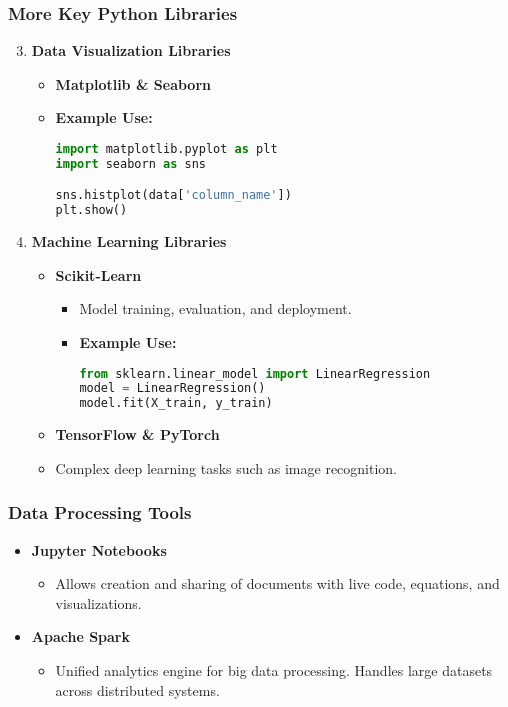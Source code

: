 \documentclass[aspectratio=169]{beamer}
\begin{document}
\begin{frame}[fragile]
    \frametitle{More Key Python Libraries}
    \begin{enumerate}
        \setcounter{enumi}{2}
        \item \textbf{Data Visualization Libraries}
        \begin{itemize}
            \item \textbf{Matplotlib \& Seaborn}
            \item \textbf{Example Use:}
            \begin{lstlisting}[language=Python]
import matplotlib.pyplot as plt
import seaborn as sns

sns.histplot(data['column_name'])
plt.show()
            \end{lstlisting}
        \end{itemize}

        \item \textbf{Machine Learning Libraries}
        \begin{itemize}
            \item \textbf{Scikit-Learn}
            \begin{itemize}
                \item Model training, evaluation, and deployment.
                \item \textbf{Example Use:}
                \begin{lstlisting}[language=Python]
from sklearn.linear_model import LinearRegression
model = LinearRegression()
model.fit(X_train, y_train)
                \end{lstlisting}
            \end{itemize}
            \item \textbf{TensorFlow \& PyTorch}
            \item Complex deep learning tasks such as image recognition.
        \end{itemize}
    \end{enumerate}
\end{frame}

\begin{frame}
    \frametitle{Data Processing Tools}
    \begin{itemize}
        \item \textbf{Jupyter Notebooks}
        \begin{itemize}
            \item Allows creation and sharing of documents with live code, equations, and visualizations.
        \end{itemize}
        
        \item \textbf{Apache Spark}
        \begin{itemize}
            \item Unified analytics engine for big data processing. Handles large datasets across distributed systems.
        \end{itemize}
    \end{itemize}
\end{frame}
\end{document}
